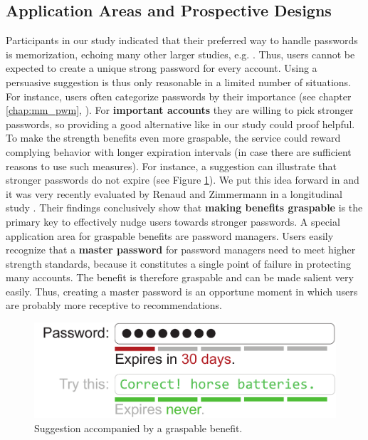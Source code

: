 \subsection{Application Areas and Prospective Designs}
Participants in our study indicated that their preferred way to handle passwords is memorization, echoing many other larger studies, e.g. \cite{CSID2012PasswordHabits, Olmstead2017AmerciansCybersecurity}. Thus, users cannot be expected to create a unique strong password for every account. Using a persuasive suggestion is thus only reasonable in a limited number of situations. For instance, users often categorize passwords by their importance (see chapter \ref{chap:mm_pwm}, \cite{Stobert2014PasswordLifeCycle, Wash2016UnderstandingPasswordChoices}). For \textbf{important accounts} they are willing to pick stronger passwords, so providing a good alternative like in our study could proof helpful. To make the strength benefits even more graspable, the service could reward complying behavior with longer expiration intervals (in case there are sufficient reasons to use such measures). For instance, a suggestion can illustrate that stronger passwords do not expire (see Figure \ref{fig:decoy:expiremockup}). We put this idea forward in \cite{Seitz2016DecoyEffect} and it was very recently evaluated by Renaud and Zimmermann in a longitudinal study \cite{Renaud2018NudgingFolks}. Their findings conclusively show that \textbf{making benefits graspable} is the primary key to effectively nudge users towards stronger passwords. A special application area for graspable benefits are password managers. Users easily recognize that a \textbf{master password} for password managers need to meet higher strength standards, because it constitutes a single point of failure in protecting many accounts. The benefit is therefore graspable and can be made salient very easily. Thus, creating a master password is an opportune moment in which users are probably more receptive to recommendations. %


\begin{figure}
	\centering
	\includegraphics[width=0.5\linewidth]{figures/decoy/expire_mockup}
	\caption{\label{fig:decoy:expiremockup}Suggestion accompanied by a graspable benefit.}
\end{figure}

